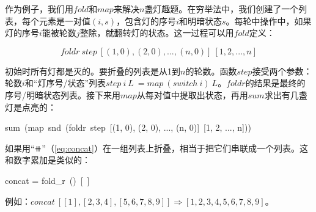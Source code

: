\documentclass[b5paper]{ctexart}
\begin{document}
作为例子，我们用$fold$和$map$来解决$n$盏灯趣题。在穷举法中，我们创建了一个列表，每个元素是一对值$(i, s)$，包含灯的序号$i$和明暗状态$s$。每轮中操作中，如果灯的序号$i$能被轮数$j$整除，就翻转灯的状态。这一过程可以用$fold$定义：

\[
foldr\ step\ [(1, 0), (2, 0), ..., (n, 0)]\ [1, 2, ..., n]
\]

初始时所有灯都是灭的。要折叠的列表是从1到$n$的轮数。函数$step$接受两个参数：轮数$i$和“灯序号/状态”列表$step\ i\ L\ = map\ (switch\ i)\ L$。$foldr$的结果是最终的序号/明暗状态列表。接下来用$map$从每对值中提取出状态，再用$sum$求出有几盏灯是点亮的：

\be
sum\ (map\ snd\ (foldr\ step\ [(1, 0), (2, 0), ..., (n, 0)]\ [1, 2, ..., n]))
\ee

如果用“$\doubleplus$”（\cref{eq:concat}）在一组列表上折叠，相当于把它们串联成一个列表。这和数字累加是类似的：

\be
concat = fold_r\ (\doubleplus)\ [\ ]
\ee

例如：$concat\ [[1], [2, 3, 4], [5, 6, 7, 8, 9]] \Rightarrow [1, 2, 3, 4, 5, 6, 7, 8, 9]$。

\begin{Exercise}[label={ex:list-fold}]
\end{Exercise}
\end{document}
